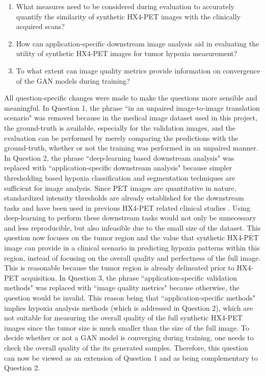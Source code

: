 \begin{enumerate}
    \item What measures need to be considered during evaluation to accurately quantify the similarity of synthetic HX4-PET images with the clinically acquired scans?
    \item How can application-specific downstream image analysis aid in evaluating the utility of synthetic HX4-PET images for tumor hypoxia measurement?
    \item To what extent can image quality metrics provide information on convergence of the GAN models during training?
\end{enumerate}

All question-specific changes were made to make the questions more sensible and meaningful. In Question 1, the phrase ``in an unpaired image-to-image translation scenario" was removed because in the medical image dataset used in this project, the ground-truth is available, especially for the validation images, and the evaluation can be performed by merely comparing the predictions with the ground-truth, whether or not the training was performed in an unpaired manner. In Question 2, the phrase ``deep-learning based downstream analysis" was replaced with ``application-specific downstream analysis" because simpler thresholding based hypoxia classification and segmentation techniques are sufficient for image analysis. Since PET images are quantitative in nature, standardized intensity thresholds are already established for the downstream tasks and have been used in previous HX4-PET related clinical studies \cite{zegers2013hypoxia, even2017predicting, sanduleanu2020hypoxia}. Using deep-learning to perform these downstream tasks would not only be unnecessary and less reproducible, but also infeasible due to the small size of the dataset. This question now focuses on the tumor region and the value that synthetic HX4-PET image can provide in a clinical scenario in predicting hypoxia patterns within this region, instead of focusing on the overall quality and perfectness of the full image. This is reasonable because the tumor region is already delineated prior to HX4-PET acquisition. In Question 3, the phrase ``application-specific validation methods" was replaced with ``image quality metrics" because otherwise, the question would be invalid. This reason being that ``application-specific methods" implies hypoxia analysis methods (which is addressed in Question 2), which are not suitable for measuring the overall quality of the full synthetic HX4-PET images since the tumor size is much smaller than the size of the full image. To decide whether or not a GAN model is converging during training, one needs to check the overall quality of the its generated samples. Therefore, this question can now be viewed as an extension of Question 1 and as being complementary to Question 2. 